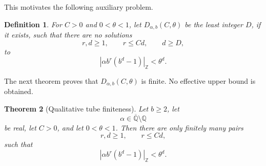 \documentclass[11pt]{amsart}
\newtheorem{theorem}{Theorem}[section]
\newtheorem{definition}[theorem]{Definition}
\newcommand{\normZ}[1]{\left|#1\right|_{\mathbb Z}}
\begin{document}
This motivates the following auxiliary problem.

\begin{definition}
For \(C>0\) and \(0<\theta<1\), let \(D_{\alpha,b}(C,\theta)\) be the least integer \(D\), if it exists, such that there are no solutions
\[
r,d\geq1,
\qquad
r\leq Cd,
\qquad
d\geq D,
\]
to
\[
\normZ{\alpha b^r(b^d-1)}<\theta^d.
\]
\end{definition}

The next theorem proves that \(D_{\alpha,b}(C,\theta)\) is finite. No effective upper bound is obtained.

\begin{theorem}[Qualitative tube finiteness]
Let \(b\geq 2\), let
\[
\alpha\in\overline{\mathbb Q}\setminus\mathbb Q
\]
be real, let \(C>0\), and let \(0<\theta<1\). Then there are only finitely many pairs
\[
r,d\geq1,
\qquad
r\leq Cd,
\]
such that
\[
\normZ{\alpha b^r(b^d-1)}<\theta^d.
\]
\end{theorem}
\end{document}
